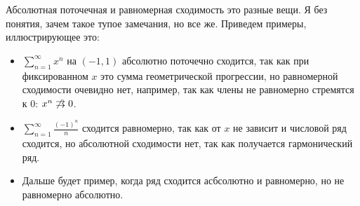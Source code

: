 \notice \; Абсолютная поточечная и равномерная сходимость это разные вещи.
Я без понятия, зачем такое тупое замечания, но все же. 
Приведем примеры, иллюстрирующее это: \begin{itemize}
    \item $\sum\limits_{n = 1}^\infty x^n$ на $(-1, 1)$ абсолютно поточечно сходится, так как при фиксированном $x$ это сумма геометрической прогрессии, но равномерной сходимости очевидно нет, например, так как члены не равномерно стремятся к 0: $x^n \not \doublerightarrow 0$.
    \item $\sum\limits_{n = 1}^\infty \frac{(-1)^n}{n}$ сходится равномерно, так как от $x$ не зависит и числовой ряд сходится, но абсолютной сходимости нет, так как получается гармонический ряд.
    \item Дальше будет пример, когда ряд сходится асбсолютно и равномерно, но не равномерно абсолютно.
\end{itemize}

